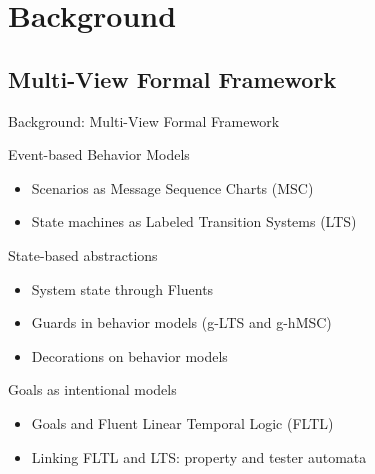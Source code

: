 \documentclass[11pt]{beamer}
\begin{document}
\section{Background}
\subsection{Multi-View Formal Framework}
\begin{frame}{Background: Multi-View Formal Framework}
  \begin{block}{Event-based Behavior Models}
    \begin{itemize}
      \item Scenarios as Message Sequence Charts (MSC)
      \item State machines as Labeled Transition Systems (LTS)
    \end{itemize}
  \end{block}
  \begin{block}{State-based abstractions}
    \begin{itemize}
      \item System state through Fluents
      \item Guards in behavior models (g-LTS and g-hMSC)
      \item Decorations on behavior models
    \end{itemize}
  \end{block}
  \begin{block}{Goals as intentional models}
    \begin{itemize}
      \item Goals and Fluent Linear Temporal Logic (FLTL)
      \item Linking FLTL and LTS: property and tester automata
    \end{itemize}
  \end{block}
\end{frame}
\end{document}
